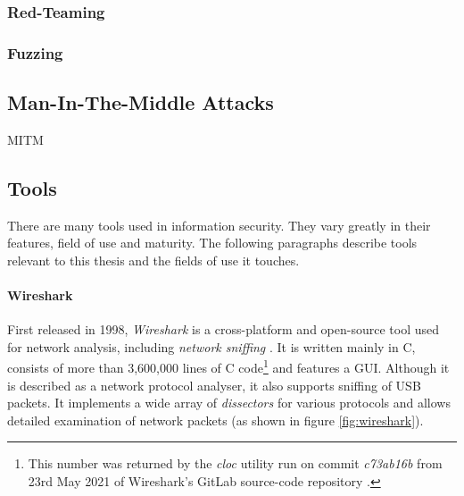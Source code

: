 \subsubsection{Red-Teaming}
\subsubsection{Fuzzing}

\subsection{Man-In-The-Middle Attacks}
\ac{MITM}

\subsection{Tools}
There are many tools used in information security. They vary greatly in their features, field of use and maturity. The following paragraphs describe tools relevant to this thesis and the fields of use it touches.

\paragraph{Wireshark} First released in 1998, \emph{Wireshark} is a cross-platform and open-source tool used for network analysis, including \emph{network sniffing} \cite{wireshark}. It is written mainly in C, consists of more than 3,600,000 lines of C code\footnote{This number was returned by the \emph{cloc} utility run on commit \emph{c73ab16b} from 23rd May 2021 of Wireshark's GitLab source-code repository \cite{wiresharkgit}.} and features a \ac{GUI}. Although it is described as a network protocol analyser, it also supports sniffing of \ac{USB} packets. It implements a wide array of \emph{dissectors} for various protocols and allows detailed examination of network packets (as shown in figure \ref{fig:wireshark}).

